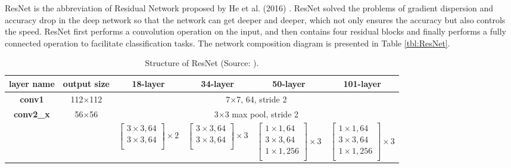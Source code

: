 \documentclass[journal,article,submit,moreauthors,pdftex]{Definitions/mdpi}
\begin{document}
ResNet is the abbreviation of Residual Network proposed by He et al. (2016) \cite{he2016deep}. ResNet solved the problems of gradient dispersion and accuracy drop in the deep network so that the network can get deeper and deeper, which not only ensures the accuracy but also controls the speed. ResNet first performs a convolution operation on the input, and then contains four residual blocks and finally performs a fully connected operation to facilitate classification tasks. The network composition diagram is presented in Table \ref{tbl:ResNet}.

\begin{table}[htbp]
\centering
\caption{Structure of ResNet (Source: \cite{he2016deep}).}
\begin{tabular}{c|c|c|c|c|c}
\hline
\textbf{layer name}                & \textbf{output size}    & \textbf{18-layer} & \textbf{34-layer} & \textbf{50-layer} & \textbf{101-layer}  \\ \hline
\textbf{conv1}                     & 112$\times$112               & \multicolumn{4}{c}{7$\times$7, 64, stride 2}                                                              \\ \hline
\multirow{2}{*}{\textbf{conv2\_x}} & \multirow{2}{*}{56$\times$56} & \multicolumn{4}{c}{3$\times$3 max pool, stride 2}                                                         \\ \cline{3-6}  &   &
$\begin{bmatrix}  
  3\times3, 64 \\  
  3\times3, 64 \\    
\end{bmatrix}\times2$
&
$\begin{bmatrix}  
  3\times3, 64 \\  
  3\times3, 64 \\    
\end{bmatrix}\times3$
& 
$\begin{bmatrix}  
  1\times1, 64 \\  
  3\times3, 64 \\
  1\times1, 256 \\      
\end{bmatrix}\times3$ 
& 
$\begin{bmatrix}  
  1\times1, 64 \\  
  3\times3, 64 \\
  1\times1, 256 \\    
\end{bmatrix}\times3$                               \\ \hline

\end{tabular}
\end{table}
\end{document}

